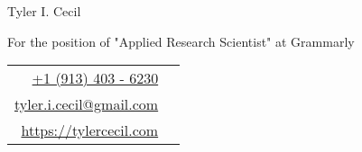 \documentclass[]{article}
\newcommand{\cvcolor}[1]{{\color{MidnightBlue}#1}}
\begin{document}
\noindent
\begin{minipage}{0.6\linewidth}
 {
 \fontsize{40pt}{50pt}\selectfont
 \noindent
 {Tyler I. Cecil}}\\
 {\Large \color{darkgray} {
   \vspace{-0.75em}

   \noindent
   For the position of "Applied Research Scientist" at Grammarly
 }}
\end{minipage}
\hfill
\begin{tabular}{|rl}
  \href{tel:+1 (913) 403 - 6230}{+1 (913) 403 - 6230}&\cvcolor{\faPhone} \\
  \href{mailto:tyler.i.cecil@gmail.com}{tyler.i.cecil@gmail.com}&\cvcolor{\faEnvelope} \\
  \href{https://tylercecil.com}{https://tylercecil.com}&\cvcolor{\faGlobe} \\
\end{tabular}

\vspace{0.5em}
\hline
\vspace{2em}
\end{document}
